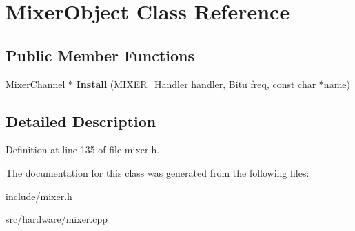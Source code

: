 \hypertarget{classMixerObject}{\section{Mixer\-Object Class Reference}
\label{classMixerObject}
}
\subsection*{Public Member Functions}
\begin{DoxyCompactItemize}
\item 
\hypertarget{classMixerObject_a69627e7e471b0afbc613a8d2b2b9221c}{\hyperlink{classMixerChannel}{Mixer\-Channel} $\ast$ {\bfseries Install} (M\-I\-X\-E\-R\-\_\-\-Handler handler, Bitu freq, const char $\ast$name)}\label{classMixerObject_a69627e7e471b0afbc613a8d2b2b9221c}

\end{DoxyCompactItemize}


\subsection{Detailed Description}


Definition at line 135 of file mixer.\-h.



The documentation for this class was generated from the following files\-:\begin{DoxyCompactItemize}
\item 
include/mixer.\-h\item 
src/hardware/mixer.\-cpp\end{DoxyCompactItemize}
